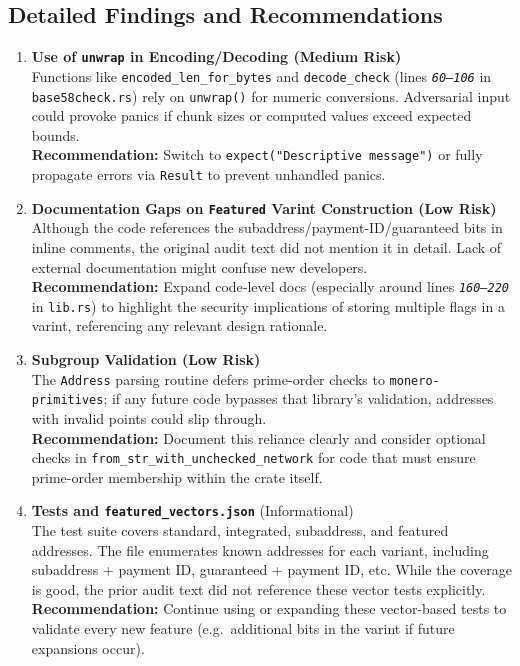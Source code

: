 \documentclass[12pt,a4paper]{article}
\begin{document}
\subsection{Detailed Findings and Recommendations}
\begin{enumerate}
    \item \textbf{Use of \texttt{unwrap} in Encoding/Decoding (Medium Risk)}\\
    Functions like \texttt{encoded\_len\_for\_bytes} and \texttt{decode\_check} (lines \textit{\texttt{60--106}} in \texttt{base58check.rs}) rely on \texttt{unwrap()} for numeric conversions. Adversarial input could provoke panics if chunk sizes or computed values exceed expected bounds.\\
    \textbf{Recommendation:} Switch to \texttt{expect("Descriptive message")} or fully propagate errors via \texttt{Result} to prevent unhandled panics.

    \item \textbf{Documentation Gaps on \texttt{Featured} Varint Construction (Low Risk)}\\
    Although the code references the subaddress/payment‐ID/guaranteed bits in inline comments, the original audit text did not mention it in detail. Lack of external documentation might confuse new developers.\\
    \textbf{Recommendation:} Expand code‐level docs (especially around lines \textit{\texttt{160--220}} in \texttt{lib.rs}) to highlight the security implications of storing multiple flags in a varint, referencing any relevant design rationale.

    \item \textbf{Subgroup Validation (Low Risk)}\\
    The \texttt{Address} parsing routine defers prime-order checks to \texttt{monero-primitives}; if any future code bypasses that library’s validation, addresses with invalid points could slip through.\\
    \textbf{Recommendation:} Document this reliance clearly and consider optional checks in \texttt{from\_str\_with\_unchecked\_network} for code that must ensure prime-order membership within the crate itself.

    \item \textbf{Tests and \texttt{featured\_vectors.json}} (Informational)\\
    The test suite covers standard, integrated, subaddress, and featured addresses. The file  enumerates known addresses for each variant, including subaddress + payment ID, guaranteed + payment ID, etc. While the coverage is good, the prior audit text did not reference these vector tests explicitly.\\
    \textbf{Recommendation:} Continue using or expanding these vector-based tests to validate every new feature (e.g.\ additional bits in the varint if future expansions occur).
\end{enumerate}
\end{document}
